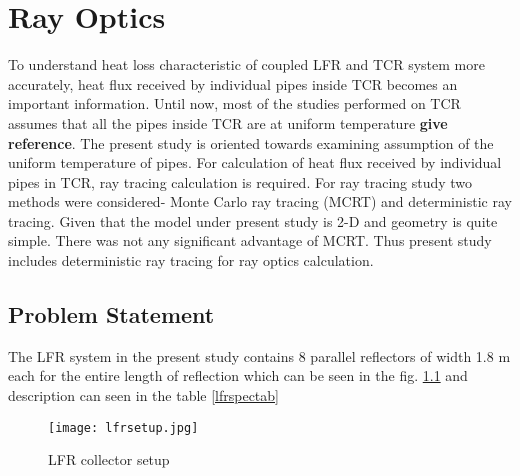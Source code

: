 \chapter{Ray Optics} \label{ch:RayOps}
To understand heat loss characteristic of coupled LFR and TCR system more accurately, heat flux received by individual pipes inside TCR becomes an important information. Until now, most of the studies performed on TCR assumes that all the pipes inside TCR are at uniform temperature {\bf give reference}. The present study is oriented towards examining assumption of the uniform temperature of pipes. For calculation of heat flux received by individual pipes in TCR, ray tracing calculation is required. For ray tracing study two methods were considered- Monte Carlo ray tracing (MCRT) and deterministic ray tracing. Given that the model under present study is 2-D and geometry is quite simple. There was not any significant advantage of MCRT. Thus present study includes deterministic ray tracing for ray optics calculation. 
\section{Problem Statement}
The LFR system in the present study contains 8 parallel reflectors of width 1.8 m each for the entire length of reflection which can be seen in the fig. \ref{lfrsetup} and description can seen in the table \ref{lfrspectab}


\begin{figure}[H]
\begin{center}
\texttt{[image: lfrsetup.jpg]}
\caption{LFR collector setup}
\end{center}
\label{lfrsetup}
\end{figure}


